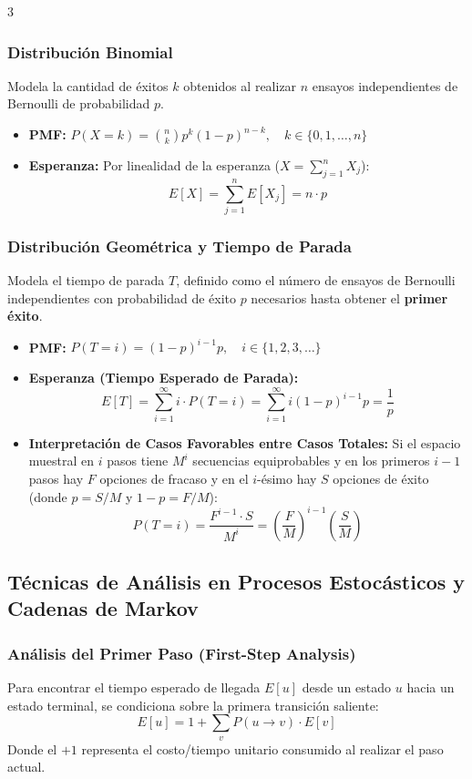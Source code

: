 \documentclass[8pt, spanish, mexico, letterpaper]{extarticle}
\newcommand{\<}{<}
\begin{document}
\begin{multicols*}{3}
\subsubsection{Distribución Binomial}
Modela la cantidad de éxitos $k$ obtenidos al realizar $n$ ensayos independientes de Bernoulli de probabilidad $p$.
\begin{itemize}
    \item \textbf{PMF:} $P(X = k) = \binom{n}{k} p^k (1-p)^{n-k}, \quad k \in \{0, 1, \dots, n\}$
    \item \textbf{Esperanza:} Por linealidad de la esperanza ($X = \sum_{j=1}^n X_j$):
    $$E[X] = \sum_{j=1}^n E[X_j] = n \cdot p$$
\end{itemize}

\subsubsection{Distribución Geométrica y Tiempo de Parada}
Modela el tiempo de parada $T$, definido como el número de ensayos de Bernoulli independientes con probabilidad de éxito $p$ necesarios hasta obtener el \textbf{primer éxito}.
\begin{itemize}
    \item \textbf{PMF:} $P(T = i) = (1-p)^{i-1} p, \quad i \in \{1, 2, 3, \dots\}$
    \item \textbf{Esperanza (Tiempo Esperado de Parada):}
    $$E[T] = \sum_{i=1}^{\infty} i \cdot P(T = i) = \sum_{i=1}^{\infty} i (1-p)^{i-1} p = \frac{1}{p}$$
    \item \textbf{Interpretación de Casos Favorables entre Casos Totales:}
    Si el espacio muestral en $i$ pasos tiene $M^i$ secuencias equiprobables y en los primeros $i-1$ pasos hay $F$ opciones de fracaso y en el $i$-ésimo hay $S$ opciones de éxito (donde $p = S/M$ y $1-p = F/M$):
    $$P(T = i) = \frac{F^{i-1} \cdot S}{M^i} = \left(\frac{F}{M}\right)^{i-1} \left(\frac{S}{M}\right)$$
\end{itemize}



\subsection{Técnicas de Análisis en Procesos Estocásticos y Cadenas de Markov}

\subsubsection{Análisis del Primer Paso (First-Step Analysis)}
Para encontrar el tiempo esperado de llegada $E[u]$ desde un estado $u$ hacia un estado terminal, se condiciona sobre la primera transición saliente:
$$E[u] = 1 + \sum_{v} P(u \to v) \cdot E[v]$$
Donde el $+1$ representa el costo/tiempo unitario consumido al realizar el paso actual.


\end{multicols*}
\end{document}
